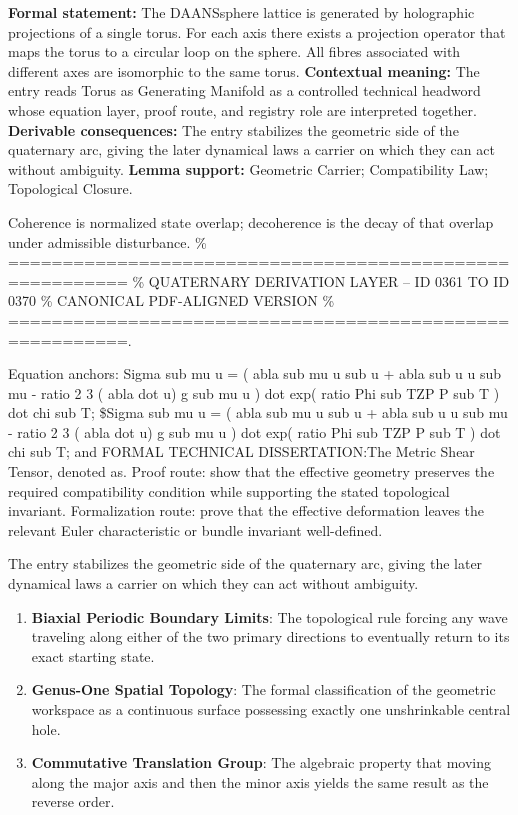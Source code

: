 \begingroup\footnotesize\setlength{\emergencystretch}{3em}\sloppy
\textbf{Formal statement:} The DAANSsphere lattice is generated by holographic projections of a single torus. For each axis there exists a projection operator that maps the torus to a circular loop on the sphere. All fibres associated with different axes are isomorphic to the same torus. \textbf{Contextual meaning:} The entry reads Torus as Generating Manifold as a controlled technical headword whose equation layer, proof route, and registry role are interpreted together. \textbf{Derivable consequences:} The entry stabilizes the geometric side of the quaternary arc, giving the later dynamical laws a carrier on which they can act without ambiguity. \textbf{Lemma support:} Geometric Carrier; Compatibility Law; Topological Closure.\par
\endgroup

Coherence is normalized state overlap; decoherence is the decay of that overlap under admissible disturbance. \% ========================================================= \% QUATERNARY DERIVATION LAYER -- ID 0361 TO ID 0370 \% CANONICAL PDF-ALIGNED VERSION \% =========================================================.

Equation anchors: Sigma sub mu u = ( abla sub mu u sub u + abla sub u u sub mu - ratio 2 3 ( abla dot u) g sub mu u ) dot exp( ratio Phi sub TZP P sub T ) dot chi sub T; \$Sigma sub mu u = ( abla sub mu u sub u + abla sub u u sub mu - ratio 2 3 ( abla dot u) g sub mu u ) dot exp( ratio Phi sub TZP P sub T ) dot chi sub T; and FORMAL TECHNICAL DISSERTATION:The Metric Shear Tensor, denoted as. Proof route: show that the effective geometry preserves the required compatibility condition while supporting the stated topological invariant. Formalization route: prove that the effective deformation leaves the relevant Euler characteristic or bundle invariant well-defined.

The entry stabilizes the geometric side of the quaternary arc, giving the later dynamical laws a carrier on which they can act without ambiguity.
\endgroup

\begin{enumerate}[leftmargin=1.6em,itemsep=6pt,topsep=4pt]
\item \textbf{Biaxial Periodic Boundary Limits}: The topological rule forcing any wave traveling along either of the two primary directions to eventually return to its exact starting state.
\item \textbf{Genus-One Spatial Topology}: The formal classification of the geometric workspace as a continuous surface possessing exactly one unshrinkable central hole.
\item \textbf{Commutative Translation Group}: The algebraic property that moving along the major axis and then the minor axis yields the same result as the reverse order.
\end{enumerate}

